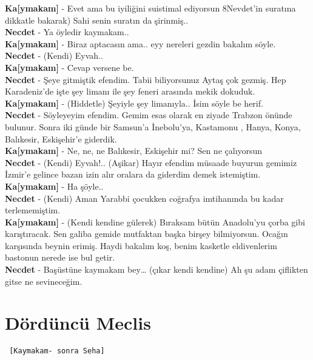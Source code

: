 \documentclass[]{book}
\begin{document}
\textbf{Ka{[}ymakam{]}} - Evet ama bu iyiliğini suistimal ediyorsun 8Nevdet'in suratına dikkatle bakarak) Sahi senin suratın da şirinmiş..\\
\textbf{Necdet} - Ya öyledir kaymakam..\\
\textbf{Ka{[}ymakam{]}} - Biraz aptacasın ama.. eyy nereleri gezdin bakalım söyle.\\
\textbf{Necdet} - (Kendi) Eyvah..\\
\textbf{Ka{[}ymakam{]}} - Cevap versene be.\\
\textbf{Necdet} - Şeye gitmiştik efendim. Tabii biliyorsunuz Aytaş çok gezmiş. Hep Karadeniz'de işte şey limanı ile şey feneri arasında mekik dokuduk.\\
\textbf{Ka{[}ymakam{]}} - (Hiddetle) Şeyiyle şey limanıyla.. İsim söyle be herif.\\
\textbf{Necdet} - Söyleyeyim efendim. Gemim esas olarak en ziyade Trabzon önünde bulunur. Sonra iki günde bir Samsun'a İnebolu'ya, Kastamonu , Hanya, Konya, Balıkesir, Eskişehir'e giderdik.\\
\textbf{Ka{[}ymakam{]}} - Ne, ne, ne Balıkesir, Eskişehir mi? Sen ne çalıyorsun\\
\textbf{Necdet} - (Kendi) Eyvah!.. (Aşikar) Hayır efendim müsaade buyurun gemimiz İzmir'e gelince bazan izin alır oralara da giderdim demek istemiştim.\\
\textbf{Ka{[}ymakam{]}} - Ha şöyle..\\
\textbf{Necdet} - (Kendi) Aman Yarabbi çocukken coğrafya imtihanında bu kadar terlememiştim.\\
\textbf{Ka{[}ymakam{]}} - (Kendi kendine gülerek) Bıraksam bütün Anadolu'yu çorba gibi karıştıracak. Sen galiba gemide mutfaktan başka birşey bilmiyorsun. Ocağın karşısında beynin erimiş. Haydi bakalım koş, benim kasketle eldivenlerim bastonun nerede ise bul getir.\\
\textbf{Necdet} - Başüstüne kaymakam bey\ldots{} (çıkar kendi kendine) Ah şu adam çiflikten gitse ne sevineceğim.\\

\hypertarget{dorduncu-meclis-1}{%
\section{Dördüncü Meclis}\label{dorduncu-meclis-1}}

\begin{verbatim}
 [Kaymakam- sonra Seha]
\end{verbatim}
\end{document}
